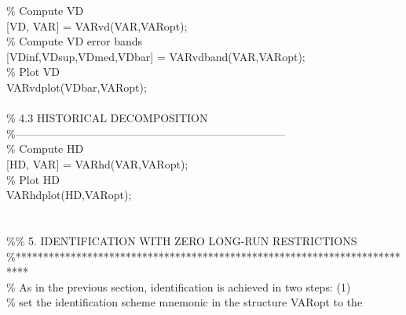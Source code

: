 \hspace{1mm}\textcolor{matlabgreen}{\% Compute VD }\\ 
\hspace{1mm}[VD, VAR] = VARvd(VAR,VARopt); \\ 
\hspace{1mm}\textcolor{matlabgreen}{\% Compute VD error bands }\\ 
\hspace{1mm}[VDinf,VDsup,VDmed,VDbar] = VARvdband(VAR,VARopt); \\ 
\hspace{1mm}\textcolor{matlabgreen}{\% Plot VD }\\ 
\hspace{1mm}VARvdplot(VDbar,VARopt); \\ 
\hspace{1mm} \\ 
\hspace{1mm}\textcolor{matlabgreen}{\% 4.3 HISTORICAL DECOMPOSITION }\\ 
\hspace{1mm}\textcolor{matlabgreen}{\%--------------------------------------------------------------------------  }\\ 
\hspace{1mm}\textcolor{matlabgreen}{\% Compute HD }\\ 
\hspace{1mm}[HD, VAR] = VARhd(VAR,VARopt); \\ 
\hspace{1mm}\textcolor{matlabgreen}{\% Plot HD }\\ 
\hspace{1mm}VARhdplot(HD,VARopt); \\ 
\hspace{1mm} \\ 
\hspace{1mm} \\ 
\hspace{1mm}\textcolor{matlabgreen}{\%}\textcolor{matlabgreen}{\% 5. IDENTIFICATION WITH ZERO LONG-RUN RESTRICTIONS  }\\ 
\hspace{1mm}\textcolor{matlabgreen}{\%**************************************************************************  }\\ 
\hspace{1mm}\textcolor{matlabgreen}{\% As in the previous section, identification is achieved in two steps: (1)  }\\ 
\hspace{1mm}\textcolor{matlabgreen}{\% set the identification scheme mnemonic in the structure VARopt to the  }\\ 
